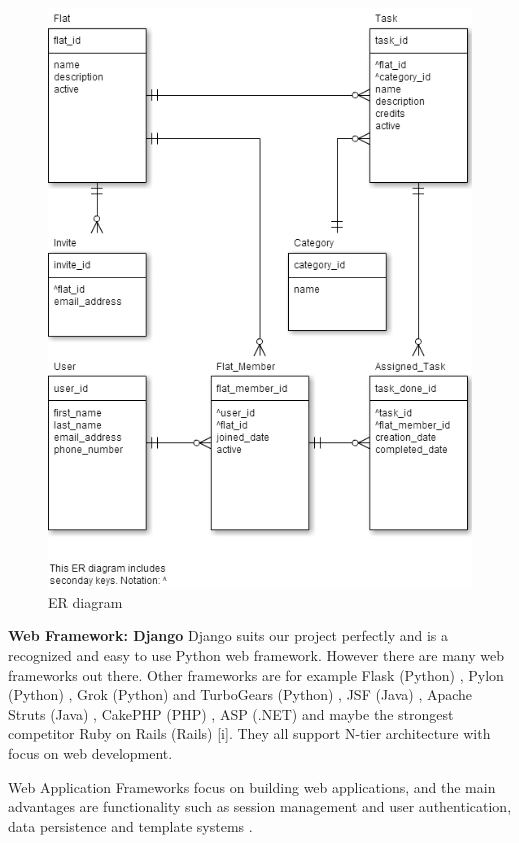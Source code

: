 \documentclass{sig-alt-release2}
\begin{document}
\begin{figure}[!ht]
\includegraphics[scale=0.7]{er}
\caption{ ER diagram}
\label{fig:er}
\end{figure}

\textbf{Web Framework: Django}
Django suits our project perfectly and is a recognized and easy to use Python web framework. However there are many web frameworks out there. Other frameworks are for example Flask (Python) , Pylon (Python) \cite{x2}, Grok (Python) \cite{x3} and TurboGears (Python) \cite{x4}, JSF (Java) \cite{x5}, Apache Struts (Java) \cite{x6}, CakePHP (PHP) \cite{x7}, ASP (.NET) \cite{x8} and maybe the strongest competitor Ruby on Rails (Rails) \cite{x9} [i]. They all support N-tier architecture with focus on web development.
 
Web Application Frameworks focus on building web applications, and the main advantages are functionality such as session management and user authentication, data persistence and template systems \cite{x10}.
\end{document}
